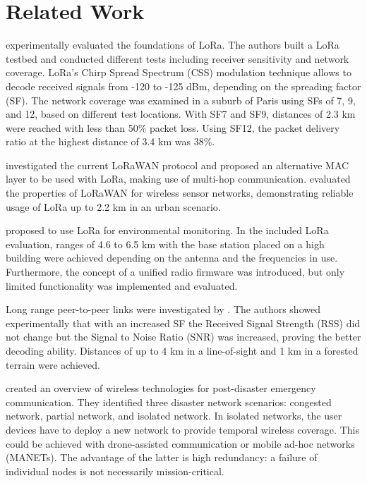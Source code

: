 \section{Related Work}
\label{hoechst2020lora:sec:relwork}

\cite{augustin2016study} experimentally evaluated the foundations of LoRa. 
The authors built a LoRa testbed and conducted different tests including receiver sensitivity and network coverage.
LoRa's Chirp Spread Spectrum (CSS) modulation technique allows to decode received signals from -120 to -125 dBm, depending on the spreading factor (SF). 
The network coverage was examined in a suburb of Paris using SFs of 7, 9, and 12, based on different test locations.
With SF7 and SF9, distances of 2.3 km were reached with less than 50\% packet loss. Using SF12, the packet delivery ratio at the highest distance of 3.4 km was 38\%.

\cite{bor2016lora} investigated the current LoRaWAN protocol and proposed an alternative MAC layer to be used with LoRa, making use of multi-hop communication. 
\cite{wixted2016evaluation} evaluated the properties of LoRaWAN for wireless sensor networks, demonstrating reliable usage of LoRa up to 2.2 km in an urban scenario.

\cite{baumgartner2018environmental} proposed to use LoRa for environmental monitoring.
In the included LoRa evaluation, ranges of 4.6 to 6.5 km with the base station placed on a high building were achieved depending on the antenna and the frequencies in use.
Furthermore, the concept of a unified radio firmware was introduced, but only limited functionality was implemented and evaluated.

Long range peer-to-peer links were investigated by \cite{callebaut2019lora}. 
The authors showed experimentally that with an increased SF the Received Signal Strength (RSS) did not change but the Signal to Noise Ratio (SNR) was increased, proving the better decoding ability.
Distances of up to 4 km in a line-of-sight and 1 km in a forested terrain were achieved.


\cite{deepak2019OverviewPostDisasterEC} created an overview of wireless technologies for post-disaster emergency communication.
They identified three disaster network scenarios: congested network, partial network, and isolated network.
In isolated networks, the user devices have to deploy a new network to provide temporal wireless coverage.
This could be achieved with drone-assisted communication or mobile ad-hoc networks (MANETs).
The advantage of the latter is high redundancy: a failure of individual nodes is not necessarily mission-critical.


